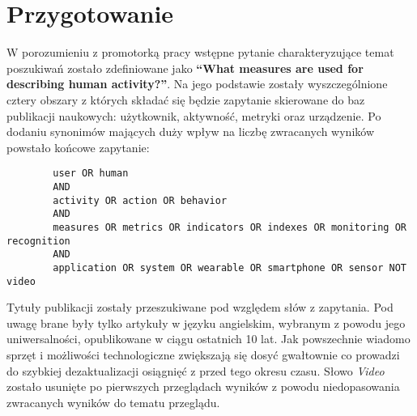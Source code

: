 \section{Przygotowanie}
W porozumieniu z promotorką pracy wstępne pytanie charakteryzujące temat poszukiwań zostało zdefiniowane jako \textbf{``What measures are used for describing human activity?''}. Na jego podstawie zostały wyszczególnione cztery obszary z których składać się będzie zapytanie skierowane do baz publikacji naukowych: użytkownik, aktywność, metryki oraz urządzenie. Po dodaniu synonimów mających duży wpływ na liczbę zwracanych wyników powstało końcowe zapytanie:
\begin{center}
	\begin{minipage}{0.9\linewidth}
		\begin{verbatim}
		user OR human
		AND
		activity OR action OR behavior
		AND
		measures OR metrics OR indicators OR indexes OR monitoring OR recognition
		AND
		application OR system OR wearable OR smartphone OR sensor NOT video
		\end{verbatim}
	\end{minipage}
\end{center}

Tytuły publikacji zostały przeszukiwane pod względem słów z zapytania. Pod uwagę brane były tylko artykuły w języku angielskim, wybranym z powodu jego uniwersalności, opublikowane w ciągu ostatnich 10 lat. Jak powszechnie wiadomo sprzęt i możliwości technologiczne zwiększają się dosyć gwałtownie co prowadzi do szybkiej dezaktualizacji osiągnięć z przed tego okresu czasu. Słowo \textit{Video} zostało usunięte po pierwszych przeglądach wyników z powodu niedopasowania zwracanych wyników do tematu przeglądu.
